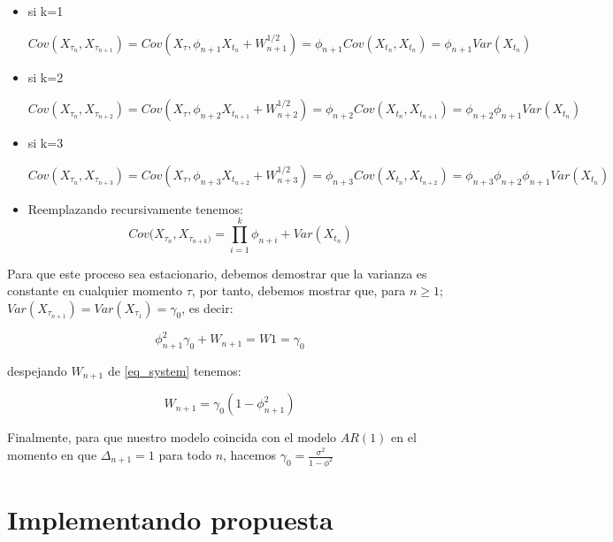 \begin{itemize}
\item si k=1

$Cov(X_{\tau_n}, X_{\tau_{n+1}}) = Cov(X_{\tau}, \phi_{n+1} X_{t_n} +W_{n+1}^{1/2}) = \phi_{n+1} Cov(X_{t_n}, X_{t_n}) = \phi_{n+1} Var(X_{t_n}) $

\item si k=2

$Cov(X_{\tau_n}, X_{\tau_{n+2}}) = Cov(X_{\tau}, \phi_{n+2} X_{t_{n+1}} +W_{n+2}^{1/2}) = \phi_{n+2} Cov(X_{t_n}, X_{t_{n+1}}) = \phi_{n+2} \phi_{n+1} Var(X_{t_n})$

\item si k=3

$Cov(X_{\tau_n}, X_{\tau_{n+3}}) = Cov(X_{\tau}, \phi_{n+3} X_{t_{n+2}} +W_{n+3}^{1/2}) = \phi_{n+3} Cov(X_{t_n}, X_{t_{n+2}}) = \phi_{n+3}\phi_{n+2} \phi_{n+1} Var(X_{t_n})$

\item Reemplazando recursivamente tenemos:
\begin{equation}
Cov(X_{\tau_n}, X_{\tau_{n+k})} = \displaystyle\prod_{i=1}^{k} \phi_{n+i}+ Var(X_{t_n})
\end{equation}\label{cov_propuesta}

\end{itemize}

Para que este proceso sea estacionario, debemos demostrar que la varianza es constante en cualquier momento $\tau$, por tanto, debemos mostrar que, para $n \geq 1$; $Var(X_{\tau_{n+1}}) = Var(X_{\tau_1}) = \gamma_0$, es decir:

\begin{equation}
\phi_{n+1}^{2}\gamma_0 + W_{n+1} = W1 = \gamma_0
\end{equation}\label{eq_system}

despejando $W_{n+1}$ de \ref{eq_system} tenemos:

\begin{equation}
W_{n+1} = \gamma_0 (1-\phi_{n+1}^2)
\end{equation}\label{eq:w}

Finalmente, para que nuestro modelo coincida con el modelo $AR(1)$ en el momento en que $\Delta_{n+1}=1$ para todo $n$, hacemos $\gamma_0 = \frac{\sigma^2}{1-\phi^2}$

\section{Implementando propuesta}

